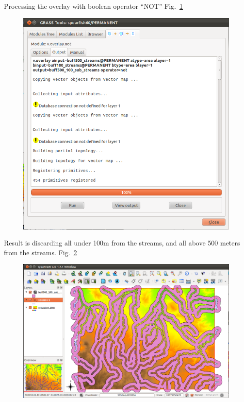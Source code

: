 Processing the overlay with boolean operator ``NOT'' Fig.~\ref{fig:qgis040}

\begin{figure}[htbp]
   \centering
   \includegraphics[scale=0.3]{qgis040.png}
   \caption{}
   \label{fig:qgis040}
\end{figure}

Result is discarding all under 100m from the streams, and all above 500
meters from the streams. Fig.~\ref{fig:qgis041}

\begin{figure}[htbp]
   \centering
   \includegraphics[scale=0.2]{qgis041.png}
   \caption{}
   \label{fig:qgis041}
\end{figure}

